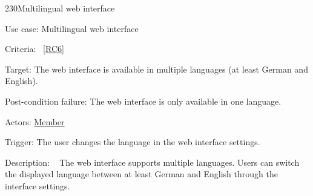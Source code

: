 \vspace{2.0em}

\begin{function}{230}{Multilingual web interface}
	\item[Use case:] Multilingual web interface
	\item[Criteria:]~\ref{RC6}
	\item[Target:] The web interface is available in multiple languages (at least German and English).
	\item[Post-condition failure:] The web interface is only available in one language.
	\item[Actors:] \hyperref[def:member]{Member}
	\item[Trigger:] The user changes the language in the web interface settings.
	\item[Description:] ~
	The web interface supports multiple languages.
	Users can switch the displayed language between at least German and English through the interface settings.
\end{function}